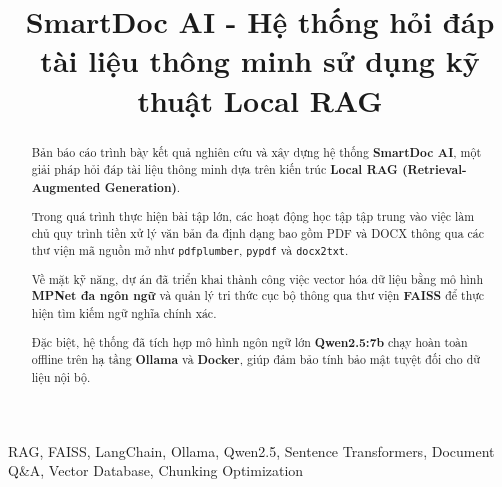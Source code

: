 ﻿\documentclass[10pt, conference, a4paper, compsocconf]{IEEEtran}
\begin{document}
\fontsize{10}{12}
\selectfont


\title{SmartDoc AI - Hệ thống hỏi đáp tài liệu thông minh sử dụng kỹ thuật Local RAG}

\author{

}

\maketitle

\begin{abstract}
Bản báo cáo trình bày kết quả nghiên cứu và xây dựng hệ thống \textbf{SmartDoc AI}, một giải pháp hỏi đáp tài liệu thông minh dựa trên kiến trúc \textbf{Local RAG (Retrieval-Augmented Generation)}. 

Trong quá trình thực hiện bài tập lớn, các hoạt động học tập tập trung vào việc làm chủ quy trình tiền xử lý văn bản đa định dạng bao gồm PDF và DOCX thông qua các thư viện mã nguồn mở như \texttt{pdfplumber}, \texttt{pypdf} và \texttt{docx2txt}. 

Về mặt kỹ năng, dự án đã triển khai thành công việc vector hóa dữ liệu bằng mô hình \textbf{MPNet đa ngôn ngữ} và quản lý tri thức cục bộ thông qua thư viện \textbf{FAISS} để thực hiện tìm kiếm ngữ nghĩa chính xác. 

Đặc biệt, hệ thống đã tích hợp mô hình ngôn ngữ lớn \textbf{Qwen2.5:7b} chạy hoàn toàn offline trên hạ tầng \textbf{Ollama} và \textbf{Docker}, giúp đảm bảo tính bảo mật tuyệt đối cho dữ liệu nội bộ. 
\end{abstract}

\begin{IEEEkeywords}
 RAG, FAISS, LangChain, Ollama, Qwen2.5, Sentence Transformers, Document Q\&A, Vector Database, Chunking Optimization
\end{IEEEkeywords}

\IEEEpeerreviewmaketitle
\end{document}
